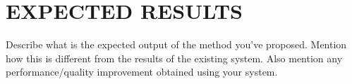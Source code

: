 \chapter{EXPECTED RESULTS}
\par Describe what is the expected output of the method you've proposed. Mention 
how this is different from the results of the existing system.
Also mention any performance/quality improvement obtained using your system.
\newpage
